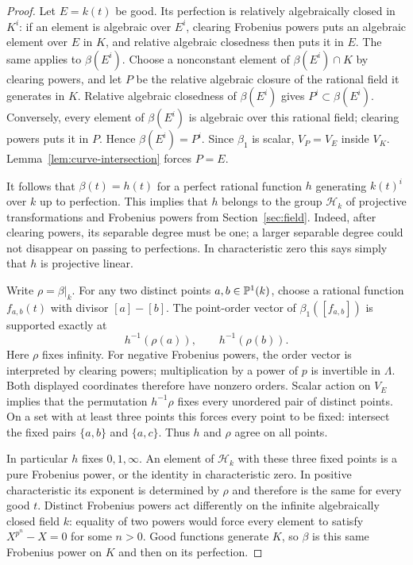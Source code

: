 \begin{proof}
Let $E=k(t)$ be good. Its perfection is relatively algebraically
closed in $K^i$: if an element is algebraic over $E^i$, clearing
Frobenius powers puts an algebraic element over $E$ in $K$, and
relative algebraic closedness then puts it in $E$. The same applies
to $\beta(E^i)$. Choose a nonconstant element of $\beta(E^i)\cap K$
by clearing powers, and let $P$ be the relative algebraic closure
of the rational field it generates in $K$. Relative algebraic closedness
of $\beta(E^i)$ gives $P^i\subset\beta(E^i)$. Conversely, every element
of $\beta(E^i)$ is algebraic over this rational field; clearing powers
puts it in $P$. Hence $\beta(E^i)=P^i$. Since $\beta_1$ is scalar, $V_P=V_E$ inside $V_K$.
Lemma~\ref{lem:curve-intersection} forces $P=E$.

It follows that $\beta(t)=h(t)$ for a perfect rational function $h$
generating $k(t)^i$ over $k$ up to perfection. This implies that $h$
belongs to the group $\mathcal H_k$ of projective transformations and
Frobenius powers from Section~\ref{sec:field}. Indeed, after clearing
powers, its separable degree must be one; a larger separable degree
could not disappear on passing to perfections. In characteristic
zero this says simply that $h$ is projective linear.

Write $\rho=\beta|_k$. For any two distinct points $a,b\in\mathbb P^1(k)$,
choose a rational function $f_{a,b}(t)$ with divisor $[a]-[b]$.
The point-order vector of $\beta_1([f_{a,b}])$ is supported exactly at
\[
 h^{-1}(\rho(a)),\qquad h^{-1}(\rho(b)).
\]
Here $\rho$ fixes infinity. For negative Frobenius powers, the order
vector is interpreted by clearing powers; multiplication by a power
of $p$ is invertible in $\Lambda$. Both displayed coordinates therefore
have nonzero orders. Scalar action on $V_E$ implies that the
permutation $h^{-1}\rho$ fixes every unordered pair of distinct
points. On a set with at least three points this forces every point
to be fixed: intersect the fixed pairs $\{a,b\}$ and $\{a,c\}$.
Thus $h$ and $\rho$ agree on all points.

In particular $h$ fixes $0,1,\infty$. An element of $\mathcal H_k$
with these three fixed points is a pure Frobenius power, or the
identity in characteristic zero. In positive characteristic its
exponent is determined by $\rho$ and therefore is the same for every
good $t$. Distinct Frobenius powers act differently on the infinite
algebraically closed field $k$: equality of two powers would force
every element to satisfy $X^{p^n}-X=0$ for some $n>0$.
Good functions generate $K$, so $\beta$ is this same Frobenius power
on $K$ and then on its perfection.
\end{proof}

